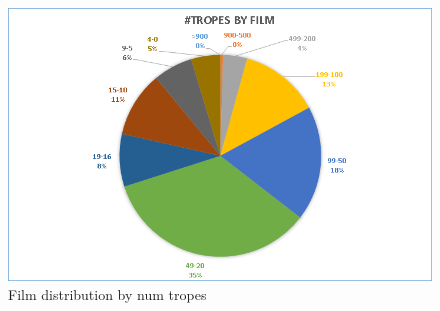 \documentclass[letterpaper]{article}
\begin{document}
\begin{figure}
	\centering
	\includegraphics{../images/num_tropes_by_film}
	\caption{Film distribution by num tropes}
	\label{fig:numtropesbyfilm}
\end{figure}










   






\end{document}

